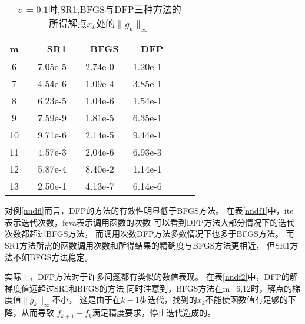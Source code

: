 \begin{example}
                \begin{table}[htbp]\center\label{nndf2}
                    \caption{$\sigma = 0.1$时,SR1,BFGS与DFP三种方法的
                            \\所得解点$x_k$处的$\|g_k\|_\infty$}
                    \begin{tabular}{ccccccccccc}
                    \toprule %
                        \multicolumn{2}{c}{m}&& 
                        \multicolumn{2}{c}{SR1}&                   \multicolumn{2}{c}{BFGS}&                  \multicolumn{2}{c}{DFP}&\\
                    \hline %
                        \multicolumn{2}{c}{6} & &7.05e-5& &2.74e-0& &1.20e-1& \\
                        \multicolumn{2}{c}{7} & &4.54e-6& &1.09e-4& &3.85e-1& \\
                        \multicolumn{2}{c}{8} & &6.23e-5& &1.04e-6& &1.54e-1& \\
                        \multicolumn{2}{c}{9} & &7.59e-9& &1.81e-5& &6.35e-1& \\
                        \multicolumn{2}{c}{10}& &9.71e-6& &2.14e-5& &9.44e-1& \\
                        \multicolumn{2}{c}{11}& &4.57e-3& &2.04e-6& &6.93e-3& \\
                        \multicolumn{2}{c}{12}& &5.87e-4& &8.40e-2& &1.14e-1& \\
                        \multicolumn{2}{c}{13}& &2.50e-1& &4.13e-7& &6.14e-6& \\
                    \bottomrule %
                    \end{tabular}
                    \label{tableExample2}
                \end{table}
            \end{example}
            
            对例\ref{nndfl}而言，DFP的方法的有效性明显低于BFGS方法。
            在表\ref{nndf1}中，ite表示迭代次数，feva表示调用函数的次数
            可以看到DFP方法大部分情况下的迭代次数都超过BFGS方法，
            而调用次数DFP方法多数情况下也多于BFGS方法。
            而SR1方法所需的函数调用次数和所得结果的精确度与BFGS方法更相近，
            但SR1方法不如BFGS方法稳定。
            
            实际上，DFP方法对于许多问题都有类似的数值表现。
            在表\ref{nndf2}中，DFP的解梯度值远超过SR1和BFGS的方法
            同时注意到，BFGS方法在m=6,12时，解点的梯度值$\|g_k\|_\infty$不小，
            这是由于在$k-1$步迭代，找到的$x_k$不能使函数值有足够的下降，从而导致
            $f_{k+1}-f_{k}$满足精度要求，停止迭代造成的。
